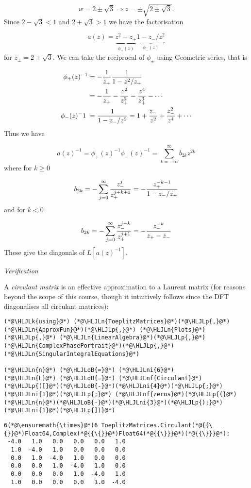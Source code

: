 \documentclass[12pt,a4paper]{article}
\newcommand{\HLJLk}[1]{\textcolor[RGB]{148,91,176}{\textbf{#1}}}
\newcommand{\HLJLn}[1]{#1}
\newcommand{\HLJLnf}[1]{\textcolor[RGB]{66,102,213}{#1}}
\newcommand{\HLJLni}[1]{\textcolor[RGB]{59,151,46}{#1}}
\newcommand{\HLJLoB}[1]{\textcolor[RGB]{102,102,102}{\textbf{#1}}}
\newcommand{\HLJLp}[1]{#1}
\def\addtab#1={#1\;&=}
\def\ccr{\\\addtab}
\def\addtab#1={#1\;&=}
\def\ccr{\\\addtab}
\begin{document}
\[
w = 2 \pm \sqrt 3 \Rightarrow z = \pm \sqrt{2 \pm \sqrt 3}.
\]
Since $2 - \sqrt 3 < 1$ and $2 + \sqrt 3 > 1$ we have the factorisation

\[
a(z) = \underbrace{z^2 - z_+}_{\phi_+(z)} \underbrace{1 - z_-/z^2}_{\phi_-(z)}
\]
for $z_{\pm} = 2 \pm \sqrt3$. We can take the reciprocal of $\phi_{\pm}$ using Geometric series, that is


\begin{align*}
\phi_+(z)^{-1} &= -{1 \over z_+} {1 \over 1 - z^2/z_+}  \ccr
= -{1 \over z_+} - {z^2 \over z_+^2} - {z^4 \over z_+^3} - \cdots \ccr
\phi_-(z)^{-1} = {1 \over 1- z_- /z^2} = 1 + {z_- \over z^2} + {z_-^2 \over z^4} + \cdots
\end{align*}
Thus we have

\[
a(z)^{-1} = \phi_+(z)^{-1} \phi_-(z)^{-1} =  \sum_{k=-\infty}^\infty b_{2k} z^{2k}
\]
where for $k \geq 0$

\[
b_{2k} =- \sum_{j=0}^\infty {z_-^j \over z_+^{j+k+1}} = - {z_+^{-k-1} \over 1 - z_-/z_+}
\]
and for $k < 0$

\[
b_{2k} =- \sum_{j=0}^\infty {z_-^{j-k} \over z_+^{j+1}} = - {z_-^{-k} \over z_+ - z_-}
\]
These give the diagonals of $L[a(z)^{-1}]$.

\emph{Verification}

A \emph{circulant matrix} is an effective approximation to a Laurent matrix (for reasons beyond the scope of this course, though it intuitively follows since the DFT diagonalises all circulant matrices):


\begin{lstlisting}
(*@\HLJLk{using}@*) (*@\HLJLn{ToeplitzMatrices}@*)(*@\HLJLp{,}@*) (*@\HLJLn{ApproxFun}@*)(*@\HLJLp{,}@*) (*@\HLJLn{Plots}@*)(*@\HLJLp{,}@*) (*@\HLJLn{LinearAlgebra}@*)(*@\HLJLp{,}@*) (*@\HLJLn{ComplexPhasePortrait}@*)(*@\HLJLp{,}@*) (*@\HLJLn{SingularIntegralEquations}@*)

(*@\HLJLn{n}@*) (*@\HLJLoB{=}@*) (*@\HLJLni{6}@*)
(*@\HLJLn{L}@*) (*@\HLJLoB{=}@*) (*@\HLJLnf{Circulant}@*)(*@\HLJLp{([}@*)(*@\HLJLoB{-}@*)(*@\HLJLni{4}@*)(*@\HLJLp{;}@*) (*@\HLJLni{1}@*)(*@\HLJLp{;}@*) (*@\HLJLnf{zeros}@*)(*@\HLJLp{(}@*)(*@\HLJLn{n}@*)(*@\HLJLoB{-}@*)(*@\HLJLni{3}@*)(*@\HLJLp{);}@*) (*@\HLJLni{1}@*)(*@\HLJLp{])}@*)
\end{lstlisting}

\begin{lstlisting}
6(*@\ensuremath{\times}@*(6 ToeplitzMatrices.Circulant(*@{{\{}}@*)Float64,Complex(*@{{\{}}@*)Float64(*@{{\}}}@*)(*@{{\}}}@*):
 -4.0   1.0   0.0   0.0   0.0   1.0
  1.0  -4.0   1.0   0.0   0.0   0.0
  0.0   1.0  -4.0   1.0   0.0   0.0
  0.0   0.0   1.0  -4.0   1.0   0.0
  0.0   0.0   0.0   1.0  -4.0   1.0
  1.0   0.0   0.0   0.0   1.0  -4.0
\end{lstlisting}
\end{document}
